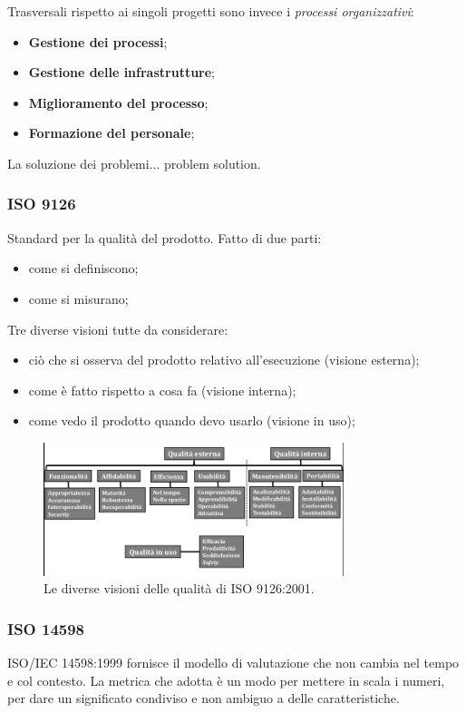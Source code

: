 			Trasversali rispetto ai singoli progetti sono invece i \textit{processi organizzativi}:
				\begin{itemize}
					\item \textbf{Gestione dei processi};
					\item \textbf{Gestione delle infrastrutture};
					\item \textbf{Miglioramento del processo};
					\item \textbf{Formazione del personale};
				\end{itemize}
			
			La soluzione dei problemi... problem solution.	%
			
			
			\subsubsection{ISO 9126}	\label{9126} %
			Standard per la qualità del prodotto.
			Fatto di due parti:
				\begin{itemize}
					\item come si definiscono;
					\item come si misurano;
				\end{itemize}
			Tre diverse visioni tutte da considerare:
				\begin{itemize}
					\item ciò che si osserva del prodotto relativo all'esecuzione (visione esterna);
					\item come è fatto rispetto a cosa fa (visione interna);
					\item come vedo il prodotto quando devo usarlo (visione in uso);
				\end{itemize}
			
			\begin{figure}[H]
				\centering
				\includegraphics[width=0.78\textwidth]{img/9126}		
				\caption{Le diverse visioni delle qualità di ISO 9126:2001.}
			\end{figure} 
			
			\subsubsection{ISO 14598}	\label{14596} 
			ISO/IEC 14598:1999 fornisce il modello di valutazione che non cambia nel tempo e col contesto. La metrica che adotta è un modo per mettere in scala i numeri, per dare un significato condiviso e non ambiguo a delle caratteristiche.
			
